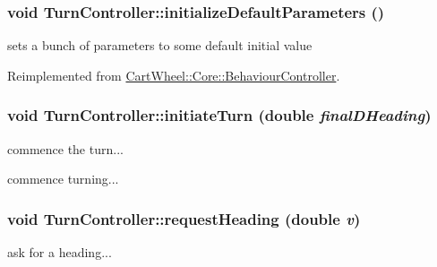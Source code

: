 \hypertarget{classCartWheel_1_1Core_1_1TurnController_a5a81b94dd968bcf38ae0008608303bf9}{
\subsubsection[{initializeDefaultParameters}]{\setlength{\rightskip}{0pt plus 5cm}void TurnController::initializeDefaultParameters ()}}
\label{classCartWheel_1_1Core_1_1TurnController_a5a81b94dd968bcf38ae0008608303bf9}
sets a bunch of parameters to some default initial value 

Reimplemented from \hyperlink{classCartWheel_1_1Core_1_1BehaviourController_a686bf6e2bc689fef41352eb1fc674884}{CartWheel::Core::BehaviourController}.

\hypertarget{classCartWheel_1_1Core_1_1TurnController_a875649169829e7e31734cb0dee2e8676}{
\subsubsection[{initiateTurn}]{\setlength{\rightskip}{0pt plus 5cm}void TurnController::initiateTurn (double {\em finalDHeading})}}
\label{classCartWheel_1_1Core_1_1TurnController_a875649169829e7e31734cb0dee2e8676}
commence the turn...

commence turning... \hypertarget{classCartWheel_1_1Core_1_1TurnController_a40ddbfce3d1b09956aeff59a17f1de6e}{
\subsubsection[{requestHeading}]{\setlength{\rightskip}{0pt plus 5cm}void TurnController::requestHeading (double {\em v})}}
\label{classCartWheel_1_1Core_1_1TurnController_a40ddbfce3d1b09956aeff59a17f1de6e}
ask for a heading... 

